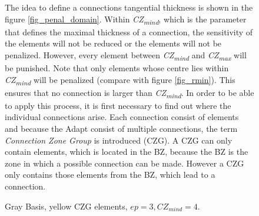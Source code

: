  \begin{figure} [!h]
 \begin{minipage}{0.45 \textwidth}
The idea to define a connections tangential thickness
is shown in the figure 
\ref{fig_penal_domain}.
 Within  \textit{CZ\textsubscript{mind}}, which
 is the parameter that defines the
 maximal thickness of a connection,
 the sensitivity of the elements
 will not be reduced or the elements will not be penalized.
  However, every element between \textit{CZ\textsubscript{mind}} and
    \textit{CZ\textsubscript{max}} will be punished. Note that only
    elements
     whose centre lies within \textit{CZ\textsubscript{mind}} will be penalized (compare with figure \ref{fig_rmin}).
     This ensures that no connection is larger than \textit{CZ\textsubscript{mind}}.
     In order to be able to apply this process, it is first necessary to find out where the individual connections arise. Each connection consist of elements and
      because the Adapt consist of multiple connections, the 
      term \emph{Connection Zone Group} is introduced (CZG).
      A CZG can only contain elements, which is
      located in the BZ, because the BZ is the zone in which a
      possible connection can be made. However a CZG only contains
      those elements from the BZ, which lead to a connection.
 \end{minipage}
 \hfill
  \begin{minipage}{0.45 \textwidth}
  \centering
 \def\svgwidth{\textwidth}
 
 \caption{Gray Basis, yellow CZG elements, $ep = 3, CZ_{mind} = 4$.}    %
 \label{fig_ep_cz_tangen}          %
 \end{minipage}
\end{figure} 
%
